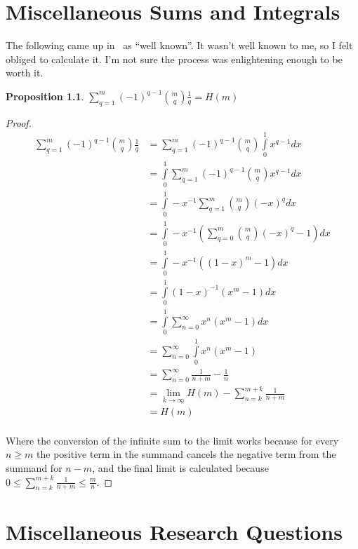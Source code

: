 \documentclass[a4paper]{book}
\newtheorem{proposition}{Proposition}
\begin{document}
\chapter{Miscellaneous Sums and Integrals}

The following came up in~\cite{DBLP:journals/dam/FlajoletGT92} as ``well known''.
It wasn't well known to me,
so I felt obliged to calculate it.
I'm not sure the process was enlightening enough to be worth it.

\begin{proposition}
\(\sum\limits_{q = 1}^m {(-1)}^{q - 1} {m \choose q} \frac{1}{q} = H(m)\)
\end{proposition}

\begin{proof}
\begin{align*}
\sum\limits_{q = 1}^m {(-1)}^{q - 1} {m \choose q} \frac{1}{q} &= \sum\limits_{q = 1}^m {(-1)}^{q - 1} {m \choose q} \int\limits_0^1 x^{q - 1} dx\\
&= \int\limits_0^1 \sum\limits_{q = 1}^m {(-1)}^{q - 1} {m \choose q} x^{q - 1} dx\\
&= \int\limits_0^1 -x^{-1} \sum\limits_{q = 1}^m {m \choose q} {(-x)}^q dx\\
&= \int\limits_0^1 -x^{-1} \left( \sum\limits_{q = 0}^m {m \choose q} {(-x)}^q - 1 \right)dx \\
&= \int\limits_0^1 -x^{-1} \left( {(1 - x)}^m - 1 \right)dx \\
&= \int\limits_0^1 {(1 - x)}^{-1} (x^m - 1) dx \\
&= \int\limits_0^1 \sum\limits_{n = 0}^\infty x^n (x^m - 1) dx \\
&= \sum\limits_{n = 0}^\infty \int\limits_0^1 x^n (x^m - 1) \\
&= \sum\limits_{n = 0}^\infty \frac{1}{n + m} - \frac{1}{n} \\
&= \lim\limits_{k \to \infty}  H(m) - \sum\limits_{n = k}^{m + k} \frac{1}{n + m}\\
&= H(m)\\
\end{align*}

Where the conversion of the infinite sum to the limit works because for every \(n \geq m\) the positive term in the summand cancels the negative term from the summand for \(n - m\),
and the final limit is calculated because \(0 \leq \sum\limits_{n = k}^{m + k} \frac{1}{n + m} \leq \frac{m}{n}\).
\end{proof}

\chapter{Miscellaneous Research Questions}
\end{document}
